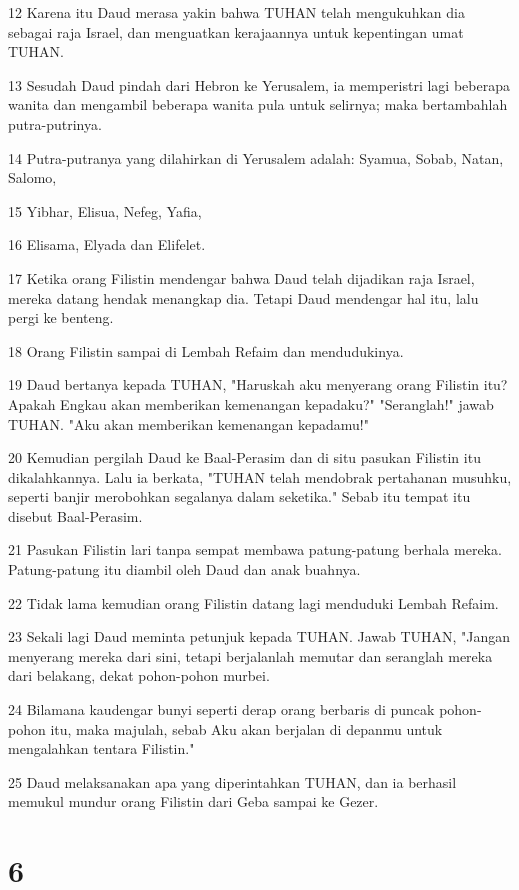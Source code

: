 \par 12 Karena itu Daud merasa yakin bahwa TUHAN telah mengukuhkan dia sebagai raja Israel, dan menguatkan kerajaannya untuk kepentingan umat TUHAN.
\par 13 Sesudah Daud pindah dari Hebron ke Yerusalem, ia memperistri lagi beberapa wanita dan mengambil beberapa wanita pula untuk selirnya; maka bertambahlah putra-putrinya.
\par 14 Putra-putranya yang dilahirkan di Yerusalem adalah: Syamua, Sobab, Natan, Salomo,
\par 15 Yibhar, Elisua, Nefeg, Yafia,
\par 16 Elisama, Elyada dan Elifelet.
\par 17 Ketika orang Filistin mendengar bahwa Daud telah dijadikan raja Israel, mereka datang hendak menangkap dia. Tetapi Daud mendengar hal itu, lalu pergi ke benteng.
\par 18 Orang Filistin sampai di Lembah Refaim dan mendudukinya.
\par 19 Daud bertanya kepada TUHAN, "Haruskah aku menyerang orang Filistin itu? Apakah Engkau akan memberikan kemenangan kepadaku?" "Seranglah!" jawab TUHAN. "Aku akan memberikan kemenangan kepadamu!"
\par 20 Kemudian pergilah Daud ke Baal-Perasim dan di situ pasukan Filistin itu dikalahkannya. Lalu ia berkata, "TUHAN telah mendobrak pertahanan musuhku, seperti banjir merobohkan segalanya dalam seketika." Sebab itu tempat itu disebut Baal-Perasim.
\par 21 Pasukan Filistin lari tanpa sempat membawa patung-patung berhala mereka. Patung-patung itu diambil oleh Daud dan anak buahnya.
\par 22 Tidak lama kemudian orang Filistin datang lagi menduduki Lembah Refaim.
\par 23 Sekali lagi Daud meminta petunjuk kepada TUHAN. Jawab TUHAN, "Jangan menyerang mereka dari sini, tetapi berjalanlah memutar dan seranglah mereka dari belakang, dekat pohon-pohon murbei.
\par 24 Bilamana kaudengar bunyi seperti derap orang berbaris di puncak pohon-pohon itu, maka majulah, sebab Aku akan berjalan di depanmu untuk mengalahkan tentara Filistin."
\par 25 Daud melaksanakan apa yang diperintahkan TUHAN, dan ia berhasil memukul mundur orang Filistin dari Geba sampai ke Gezer.

\chapter{6}

